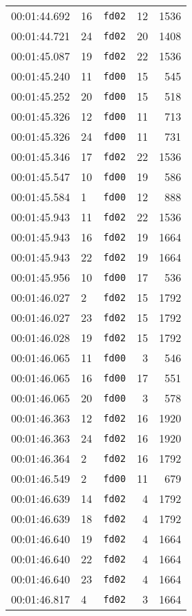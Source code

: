 \documentclass{article}
\begin{document}
\begin{longtable}{lllrr}
00:01:44.692 & 16 & \texttt{fd02} & 12 & 1536 \\
00:01:44.721 & 24 & \texttt{fd02} & 20 & 1408 \\
00:01:45.087 & 19 & \texttt{fd02} & 22 & 1536 \\
00:01:45.240 & 11 & \texttt{fd00} & 15 & 545 \\
00:01:45.252 & 20 & \texttt{fd00} & 15 & 518 \\
00:01:45.326 & 12 & \texttt{fd00} & 11 & 713 \\
00:01:45.326 & 24 & \texttt{fd00} & 11 & 731 \\
00:01:45.346 & 17 & \texttt{fd02} & 22 & 1536 \\
00:01:45.547 & 10 & \texttt{fd00} & 19 & 586 \\
00:01:45.584 & 1 & \texttt{fd00} & 12 & 888 \\
00:01:45.943 & 11 & \texttt{fd02} & 22 & 1536 \\
00:01:45.943 & 16 & \texttt{fd02} & 19 & 1664 \\
00:01:45.943 & 22 & \texttt{fd02} & 19 & 1664 \\
00:01:45.956 & 10 & \texttt{fd00} & 17 & 536 \\
00:01:46.027 & 2 & \texttt{fd02} & 15 & 1792 \\
00:01:46.027 & 23 & \texttt{fd02} & 15 & 1792 \\
00:01:46.028 & 19 & \texttt{fd02} & 15 & 1792 \\
00:01:46.065 & 11 & \texttt{fd00} & 3 & 546 \\
00:01:46.065 & 16 & \texttt{fd00} & 17 & 551 \\
00:01:46.065 & 20 & \texttt{fd00} & 3 & 578 \\
00:01:46.363 & 12 & \texttt{fd02} & 16 & 1920 \\
00:01:46.363 & 24 & \texttt{fd02} & 16 & 1920 \\
00:01:46.364 & 2 & \texttt{fd02} & 16 & 1792 \\
00:01:46.549 & 2 & \texttt{fd00} & 11 & 679 \\
00:01:46.639 & 14 & \texttt{fd02} & 4 & 1792 \\
00:01:46.639 & 18 & \texttt{fd02} & 4 & 1792 \\
00:01:46.640 & 19 & \texttt{fd02} & 4 & 1664 \\
00:01:46.640 & 22 & \texttt{fd02} & 4 & 1664 \\
00:01:46.640 & 23 & \texttt{fd02} & 4 & 1664 \\
00:01:46.817 & 4 & \texttt{fd02} & 3 & 1664 \\

\end{longtable}
\end{document}
